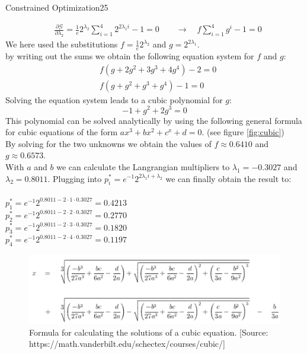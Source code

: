 \begin{questions}
\begin{question}{Constrained Optimization}{25}
\begin{answer}
\begin{equation*}
\begin{split}
& \frac{\partial\mathcal{G}}{\partial \lambda_2} = \frac{1}{e} 2^{\lambda_2}\sum_{i=1}^4 2^{2\lambda_1 i} - 1 = 0 \qquad \rightarrow \quad f\sum_{i=1}^4  g^i -1 = 0
\end{split}
\end{equation*}
We here used the substitutions $f=\frac{1}{e}2^{\lambda_2}$ and $g=2^{2\lambda_1}$.\\
by writing out the sums we obtain the following equation system for $f$ and $g$:
\begin{equation*}
\begin{split}
& f (g+2g^2+3g^3+4g^4)-2=0\\
& f (g+g^2+g^3+g^4)-1=0
\end{split}
\end{equation*} 
Solving the equation system leads to a cubic polynomial for $g$:
\begin{equation*}
-1+g^2+2g^3 = 0
\end{equation*} 
This polynomial can be solved analytically by using the following general formula for cubic equations of the form $ax^3+bx^2+c^x+d=0$. (see figure \ref{fig:cubic}) \\
By solving for the two unknowns we obtain the values of $f\approx 0.6410$ and $g\approx0.6573$.\\
 With $a$ and $b$ we can calculate the Langrangian multipliers to $\lambda_1=-0.3027$ and $\lambda_2=0.8011$.
Plugging into $p_{i}^{*}=e^{-1} 2^{2 \lambda_{1} i+\lambda_{2}}$ we can finally obtain the result to:\\ \\
$p_{1}^{*}=e^{-1} 2^{0.8011 - 2 \cdot 1 \cdot 0.3027} = 0.4213$\\
$p_{2}^{*}=e^{-1} 2^{0.8011- 2 \cdot 2 \cdot 0.3027} = 0.2770 $\\
$p_{3}^{*}=e^{-1} 2^{0.8011- 2 \cdot 3 \cdot 0.3027} = 0.1820$\\
$p_{4}^{*}=e^{-1} 2^{0.8011- 2 \cdot 4 \cdot 0.3027 }= 0.1197$
\end{answer}
\begin{figure}[h]
	\includegraphics[width=12cm, scale=0.5]{cubics.png}
	\caption{Formula for calculating the solutions of a cubic equation. [Source: https://math.vanderbilt.edu/schectex/courses/cubic/]}

\end{figure}
\end{question}
\end{questions}
